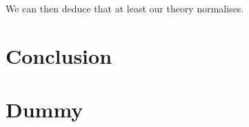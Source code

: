 \documentclass[11pt]{article}
\newcommand{\0}{\mathbf{0}}
\newcommand{\1}{\mathbf{1}}
\begin{document}
We can then deduce that at least our theory normalises.

%
%
%
%


\section{Conclusion}



\newpage

\appendix
\appendixname

\section{Dummy}

\printbibliography
\end{document}
